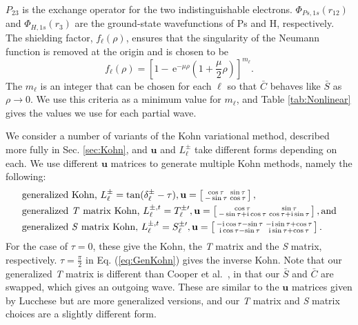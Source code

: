 \documentclass[preprint,showpacs,showkeys,preprintnumbers,amsmath,amssymb,longbibliography,pra,aps]{revtex4-1}
\newcommand{\ee} {\,\text{e}}
\newcommand{\ii}{{\rm{i}}}
\begin{document}
$P_{23}$ is the exchange operator for the two indistinguishable electrons.
$\Phi_{Ps,1s}\left(r_{12}\right)$ and $\Phi_{H,1s}\left(r_3\right)$ are the 
ground-state wavefunctions of Ps and H, respectively. The shielding factor,
$f_\ell(\rho)$, ensures that the singularity of the Neumann function is removed
at the origin and is chosen to be
\begin{equation}
f_\ell(\rho) = \left[1 - \ee^{-\mu \rho} \left(1+\frac{\mu}{2}\rho\right)
\right]^{m_\ell}.
\label{eq:PartialWaveShielding}
\end{equation}
The $m_\ell$ is an integer that can be chosen for each $\ell$ so that $\bar{C}$
behaves like $\bar{S}$ as $\rho \rightarrow 0$. We use this criteria as a 
minimum value for $m_\ell$, and Table \ref{tab:Nonlinear} gives the values we 
use for each partial wave.

We consider a number of variants of the Kohn variational method, described more
fully in Sec. \ref{sec:Kohn}, and $\textbf{u}$ and $L^{\pm}_\ell$ take
different forms depending on each. We use different $\textbf{u}$ matrices to
generate multiple Kohn methods, namely the following:
\begin{subequations}
\label{eq:KohnU}
\begin{align}
&\text{generalized Kohn, } L^{\pm}_\ell = \tan(\delta^{\pm}_\ell-\tau),
 \textbf{u} = \left[ \begin{smallmatrix}
\cos \tau & \sin \tau \\  -\sin \tau & \cos \tau
\end{smallmatrix} \right], \label{eq:GenKohn}\\
&\text{generalized \emph{T} matrix Kohn, } L^{\pm,t}_\ell = T_\ell^{\pm\prime},
 \textbf{u} = \left[ \begin{smallmatrix}
\cos\tau & \sin\tau \\ -\sin\tau + \ii \cos\tau & \cos\tau + \ii \sin\tau
\end{smallmatrix} \right], \text{and}\label{eq:GenTKohn} \\
&\text{generalized \emph{S} matrix Kohn, } L^{\pm,t}_\ell = S_\ell^{\pm\prime},
 \textbf{u} = \left[ \begin{smallmatrix}
-\ii \cos\tau - \sin\tau & -\ii\sin\tau + \cos\tau \\ 
 \ii\cos\tau - \sin\tau & \ii\sin\tau + \cos\tau
\end{smallmatrix} \right]. \label{eq:GenSKohn}
\end{align}
\end{subequations}
For the case of $\tau = 0$, these give the Kohn, the \emph{T} matrix and the 
\emph{S} matrix, respectively. $\tau = \frac{\pi}{2}$ in Eq. (\ref{eq:GenKohn})
gives the inverse Kohn. Note that our generalized \emph{T} matrix is 
different than Cooper et al.\ \cite{Cooper2010}, in that our $\bar{S}$ and
$\bar{C}$ are swapped, which gives an outgoing wave. These are similar to the
$\textbf{u}$ matrices given by Lucchese \cite{Lucchese1989} but are more 
generalized versions, and our \emph{T} matrix and \emph{S} matrix choices are 
a slightly different form.
\end{document}
